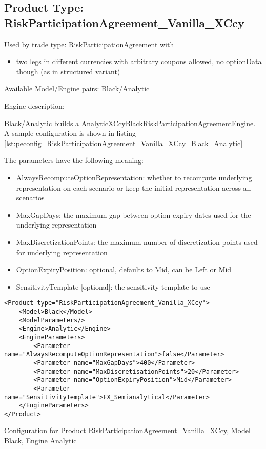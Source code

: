 \subsection{Product Type: RiskParticipationAgreement\_Vanilla\_XCcy}

Used by trade type: RiskParticipationAgreement with

\begin{itemize}
\item two legs in different currencies with arbitrary coupons allowed, no
  optionData though (as in structured variant)
\end{itemize}

Available Model/Engine pairs: Black/Analytic

Engine description:

Black/Analytic builds a AnalyticXCcyBlackRiskParticipationAgreementEngine. A sample configuration is shown in listing
\ref{lst:peconfig_RiskParticipationAgreement_Vanilla_XCcy_Black_Analytic}

The parameters have the following meaning:

\begin{itemize}
\item AlwaysRecomputeOptionRepresentation: whether to recompute underlying representation on each scenario or keep the initial representation across all scenarios
\item MaxGapDays: the maximum gap between option expiry dates used for the underlying representation
\item MaxDiscretizationPoints: the maximum number of discretization points used for underlying representation
\item OptionExpiryPosition: optional, defaults to Mid, can be Left or Mid
\item SensitivityTemplate [optional]: the sensitivity template to use 
\end{itemize}

\begin{longlisting}
\begin{verbatim}
<Product type="RiskParticipationAgreement_Vanilla_XCcy">
    <Model>Black</Model>
    <ModelParameters/>
    <Engine>Analytic</Engine>
    <EngineParameters>
        <Parameter name="AlwaysRecomputeOptionRepresentation">false</Parameter>
        <Parameter name="MaxGapDays">400</Parameter>
        <Parameter name="MaxDiscretisationPoints">20</Parameter>
        <Parameter name="OptionExpiryPosition">Mid</Parameter>
        <Parameter name="SensitivityTemplate">FX_Semianalytical</Parameter>
    </EngineParameters>
</Product>
\end{verbatim}
\caption{Configuration for Product RiskParticipationAgreement\_Vanilla\_XCcy, Model Black, Engine Analytic}
\label{lst:peconfig_RiskParticipationAgreement_Vanilla_XCcy_Black_Analytic}
\end{longlisting}

